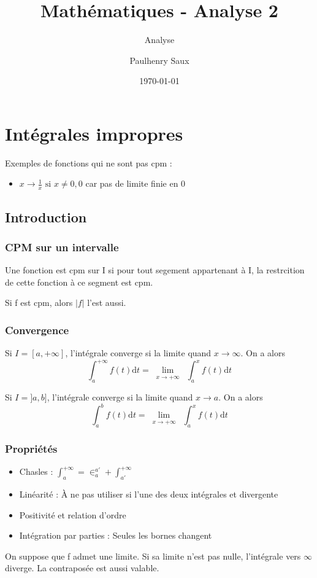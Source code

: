 \documentclass[french]{yLectureNote}
\title{Mathématiques - Analyse 2}
\subtitle{Analyse}
\author{Paulhenry Saux}
\date{\today}
\newcommand{\Lim}[1]{\lim\limits_{\substack{#1}}\:}
\newcommand{\dd}[0]{\mathrm{d}}
\begin{document}
\setcounter{chapter}{4}

	\chapter{Intégrales impropres}

Exemples de fonctions qui ne sont pas cpm :
\begin{itemize}
 \item \(x\to \frac{1}{x} \text{ si } x\neq 0, 0\) car pas de limite finie en 0
\end{itemize}
\section{Introduction}
\subsection{CPM sur un intervalle}
\begin{definition}
Une fonction est cpm sur I si pour tout segement appartenant à I, la restrcition de cette fonction à ce segment est cpm.
\end{definition}
\begin{proposition}
Si f est cpm, alors \(|f|\) l'est aussi.
\end{proposition}
\subsection{Convergence}
\begin{definition}
Si \(I = [a,+\infty]\), l'intégrale converge si la limite quand \(x\to \infty\). On a alors \[\int^{+\infty}_{a} f(t)\dd t = \Lim{x\to +\infty} \int^x_a f(t)\dd t\]

Si \(I = ]a,b]\), l'intégrale converge si la limite quand \(x\to a\). On a alors \[\int^{b}_{a} f(t)\dd t = \Lim{x\to +\infty} \int^x_a f(t)\dd t\]
\end{definition}
\subsection{Propriétés}
\begin{proposition}
\begin{itemize}
 \item Chasles : \(\int^{+\infty}_a = \in^{a'}_a + \int^{+\infty}_{a'}\)
 \item Linéarité : À ne pas utiliser si l'une des deux intégrales et divergente
 \item Positivité et relation d'ordre
 \item Intégration par parties : Seules les bornes changent
\end{itemize}
\end{proposition}
\begin{proposition}
On suppose que f admet une limite. Si sa limite n'est pas nulle, l'intégrale vers \(\infty\) diverge. La contraposée est aussi valable.
\end{proposition}
\end{document}
